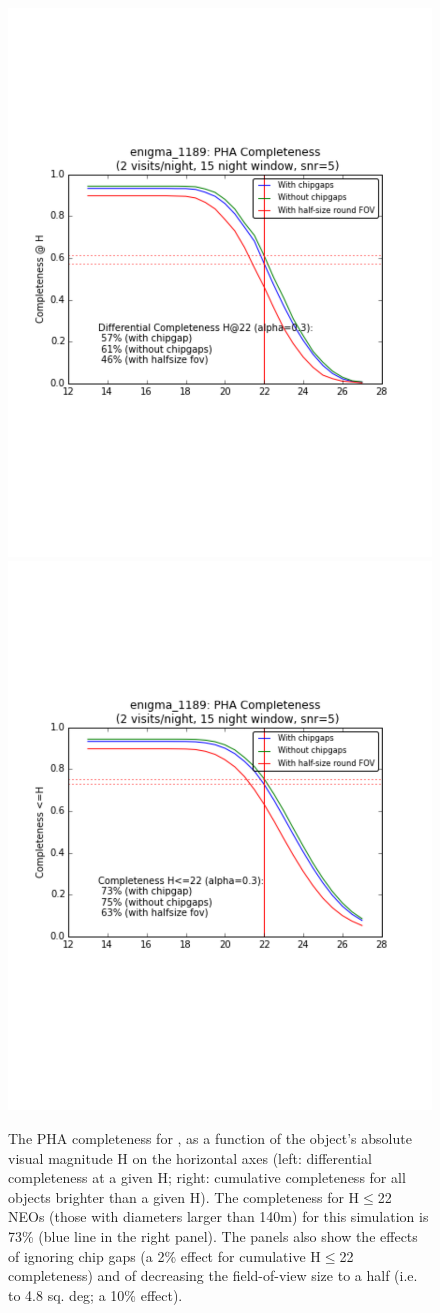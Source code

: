 \begin{figure}[t!]
\vskip -1.1in
\includegraphics[angle=0,width=0.56\hsize:,clip]{figs/enigma1189_diffNEOcompleteness.pdf}
\hskip -0.5in
\includegraphics[angle=0,width=0.56\hsize:,clip]{figs/enigma1189_cumNEOcompleteness.pdf}
\vskip -1.2in
\caption{The PHA completeness for , as a function of the object's absolute
visual magnitude H on the horizontal axes (left: differential completeness at a given H;
right: cumulative completeness for all objects brighter than a given H).
The completeness for H$\le$22 NEOs (those with diameters larger than 140m)  for this
simulation is 73\% (blue line in the right panel). The panels also show the effects of ignoring
chip gaps (a 2\% effect for cumulative H$\le$22 completeness) and of decreasing the
field-of-view size to a half (i.e. to 4.8 sq. deg; a 10\% effect).}
\label{fig:enigmaNEO}
\end{figure}



